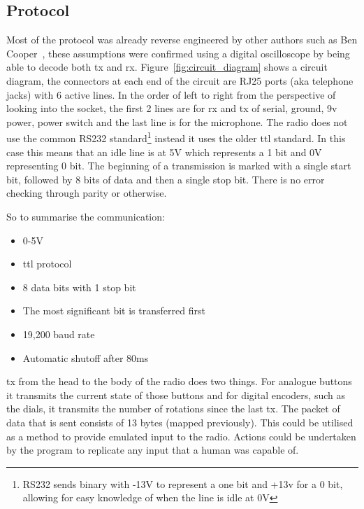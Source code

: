 \subsection{Protocol}
Most of the protocol was already reverse engineered by other authors such as Ben Cooper~\cite{ben_report}, these assumptions were confirmed using a digital oscilloscope by being able to decode both \gls{tx} and \gls{rx}. Figure~\ref{fig:circuit_diagram} shows a circuit diagram, the connectors at each end of the circuit are RJ25 ports (aka telephone jacks) with 6 active lines. In the order of left to right from the perspective of looking into the socket, the first 2 lines are for \gls{rx} and \gls{tx} of serial, ground, 9v power, power switch and the last line is for the microphone. The radio does not use the common RS232 standard\footnote{RS232 sends binary with -13V to represent a one bit and +13v for a 0 bit, allowing for easy knowledge of when the line is idle at 0V} instead it uses the older \gls{ttl} standard. In this case this means that an idle line is at 5V which represents a 1 bit and 0V representing 0 bit. The beginning of a transmission is marked with a single start bit, followed by 8 bits of data and then a single stop bit. There is no error checking through parity or otherwise. 

So to summarise the communication: 
\begin{itemize}
    \item 0-5V
    \item \gls{ttl} protocol
    \item 8 data bits with 1 stop bit
    \item The most significant bit is transferred first
    \item 19,200 baud rate
    \item Automatic shutoff after 80ms
\end{itemize}

\gls{tx} from the head to the body of the radio does two things. For analogue buttons it transmits the current state of those buttons and for digital encoders, such as the dials, it transmits the number of rotations since the last \gls{tx}. The packet of data that is sent consists of 13 bytes (mapped previously\cite{ben_report}). This could be utilised as a method to provide emulated input to the radio. Actions could be undertaken by the program to replicate any input that a human was capable of.

